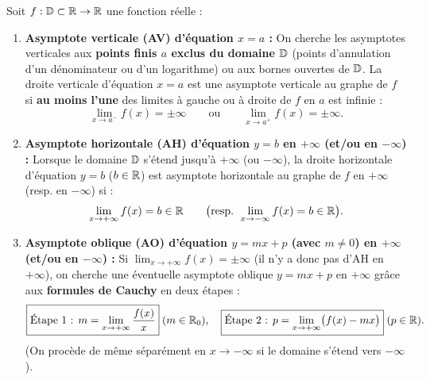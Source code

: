 \begin{theoreme}
Soit $f : \mathbb{D} \subset \mathbb{R} \to \mathbb{R}$ une fonction réelle :
\begin{enumerate}
    \item \textbf{Asymptote verticale (AV) d'équation $\boxed{x = a}$ :}
    On cherche les asymptotes verticales aux \textbf{points finis $a$ exclus du domaine $\mathbb{D}$} (points d'annulation d'un dénominateur ou d'un logarithme) ou aux bornes ouvertes de $\mathbb{D}$. La droite verticale d'équation $x = a$ est une asymptote verticale au graphe de $f$ si \textbf{au moins l'une} des limites à gauche ou à droite de $f$ en $a$ est infinie :
    \[
        \lim_{x \to a^-} f(x) = \pm\infty \qquad \text{ou} \qquad \lim_{x \to a^+} f(x) = \pm\infty.
    \]
    \item \textbf{Asymptote horizontale (AH) d'équation $\boxed{y = b}$ en $+\infty$ (et/ou en $-\infty$) :}
    Lorsque le domaine $\mathbb{D}$ s'étend jusqu'à $+\infty$ (ou $-\infty$), la droite horizontale d'équation $y = b$ ($b \in \mathbb{R}$) est asymptote horizontale au graphe de $f$ en $+\infty$ (resp. en $-\infty$) si :
    \[
        \lim_{x \to +\infty} f(x) = b \in \mathbb{R} \qquad \bigl(\text{resp. } \lim_{x \to -\infty} f(x) = b \in \mathbb{R}\bigr).
    \]
    \item \textbf{Asymptote oblique (AO) d'équation $\boxed{y = mx + p}$ (avec $m \neq 0$) en $+\infty$ (et/ou en $-\infty$) :}
    Si $\lim_{x \to +\infty} f(x) = \pm\infty$ (il n'y a donc pas d'AH en $+\infty$), on cherche une éventuelle asymptote oblique $y = mx + p$ en $+\infty$ grâce aux \textbf{formules de Cauchy} en deux étapes :
    \[
        \boxed{\text{Étape 1 : } m = \lim_{x \to +\infty} \frac{f(x)}{x}} \; (m \in \mathbb{R}_0), \quad \boxed{\text{Étape 2 : } p = \lim_{x \to +\infty} \bigl(f(x) - mx\bigr)} \; (p \in \mathbb{R}).
    \]
    (On procède de même séparément en $x \to -\infty$ si le domaine s'étend vers $-\infty$).
\end{enumerate}
\end{theoreme}

